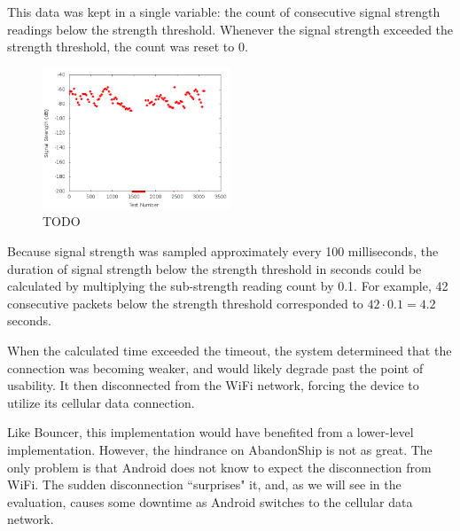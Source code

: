 This data was kept in a single variable: the count of consecutive signal strength readings below the strength threshold. Whenever the signal strength exceeded the strength threshold, the count was reset to 0.

\begin{figure}
	\includegraphics[width=0.5\textwidth]{sigStrength}
	\caption{TODO}
\end{figure}

Because signal strength was sampled approximately every 100 milliseconds, the duration of signal strength below the strength threshold in seconds could be calculated by multiplying the sub-strength reading count by 0.1. For example, 42 consecutive packets below the strength threshold corresponded to $ 42 \cdot 0.1 = 4.2 $ seconds.

When the calculated time exceeded the timeout, the system determineed that the connection was becoming weaker, and would likely degrade past the point of usability. It then disconnected from the WiFi network, forcing the device to utilize its cellular data connection.

Like Bouncer, this implementation would have benefited from a lower-level implementation. However, the hindrance on AbandonShip is not as great. The only problem is that Android does not know to expect the disconnection from WiFi. The sudden disconnection ``surprises" it, and, as we will see in the evaluation, causes some downtime as Android switches to the cellular data network.
